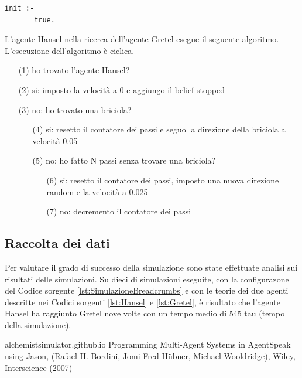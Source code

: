 \documentclass[12pt,a4paper,openright,twoside]{report}
\begin{document}
\medskip
\begin{lstlisting}[firstnumber=1,label={lst:Blackboard},caption={Teoria per gli spazi di tuple}]
   init :-
       true.
\end{lstlisting}

L'agente Hansel nella ricerca dell'agente Gretel esegue il seguente algoritmo. L'esecuzione dell'algoritmo \`e ciclica.
\begin{itemize}
   \item[(1)] ho trovato l'agente Hansel?
   \item[(2)] si: imposto la velocit\`a a 0 e aggiungo il belief stopped
   \item[(3)] no: ho trovato una briciola?
   \begin{itemize}
      \item[(4)] si: resetto il contatore dei passi e seguo la direzione della briciola a velocit\`a 0.05
      \item[(5)] no: ho fatto N passi senza trovare una briciola?
      \begin{itemize}
         \item[(6)] si: resetto il contatore dei passi, imposto una nuova direzione random e la velocit\`a a 0.025
         \item[(7)] no: decremento il contatore dei passi
      \end{itemize}
   \end{itemize}
\end{itemize}

\subsection{Raccolta dei dati}
Per valutare il grado di successo della simulazione sono state effettuate analisi sui risultati delle simulazioni. Su dieci di simulazioni eseguite, con la configurazone del Codice sorgente \ref{lst:SimulazioneBreadcrumbs} e con le teorie dei due agenti descritte nei Codici sorgenti \ref{lst:Hansel} e \ref{lst:Gretel}, \`e risultato che l'agente Hansel ha raggiunto Gretel nove volte con un tempo medio di 545 tau (tempo della simulazione).


\begin{thebibliography}{90} %
\rhead[\fancyplain{}{\bfseries \leftmark}]{\fancyplain{}{\bfseries \thepage}}

 alchemistsimulator.github.io
 Programming Multi-Agent Systems in AgentSpeak using Jason, (Rafael H. Bordini, Jomi Fred H\"{u}bner, Michael Wooldridge), Wiley, Interscience (2007)

\end{thebibliography}
\end{document}
